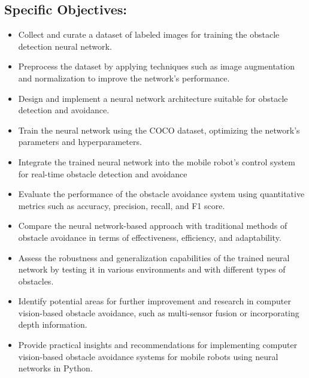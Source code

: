 \subsection{Specific Objectives:}

\begin{itemize}
     \item Collect and curate a dataset of labeled images for training the obstacle detection neural network.
    \item Preprocess the dataset by applying techniques such as image augmentation and normalization to improve the network's performance.
    \item Design and implement a neural network architecture suitable for obstacle detection and avoidance.
    \item Train the neural network using the COCO dataset, optimizing the network's parameters and hyperparameters.
    \item 	Integrate the trained neural network into the mobile robot's control system for real-time obstacle detection and avoidance
    \item Evaluate the performance of the obstacle avoidance system using quantitative metrics such as accuracy, precision, recall, and F1 score.
    \item Compare the neural network-based approach with traditional methods of obstacle avoidance in terms of effectiveness, efficiency, and adaptability.
    \item Assess the robustness and generalization capabilities of the trained neural network by testing it in various environments and with different types of obstacles.
    \item Identify potential areas for further improvement and research in computer vision-based obstacle avoidance, such as multi-sensor fusion or incorporating depth information.
    \item Provide practical insights and recommendations for implementing computer vision-based obstacle avoidance systems for mobile robots using neural networks in Python.
\end{itemize}
